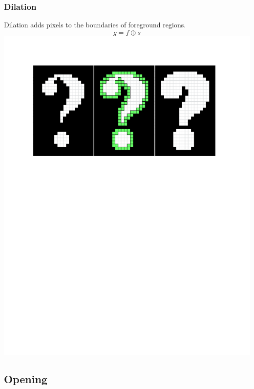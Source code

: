 \documentclass{beamer}
\begin{document}
\begin{frame}
\frametitle{Dilation}
\begin{center}
Dilation adds pixels to the boundaries of foreground regions.
\begin{equation*}
g = f \oplus s
\end{equation*}
\includegraphics[width=1\textwidth,trim={0 0 0 0.5in},clip]{dilation}
\end{center}
\end{frame}

\subsection[Opening]{Opening}
\end{document}
